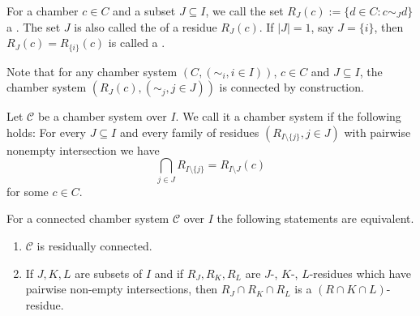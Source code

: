 \begin{defi}
	For a chamber $c \in C$ and a subset $J \subseteq I$, we call the set $R_J(c) := \{ d \in C : c \sim_J d \}$ a . The set $J$ is also called the  of a residue $R_J(c)$. If $|J| = 1$, say $J = \{i\}$, then $R_J(c) = R_{\{i\}}(c)$ is called a .
\end{defi}

Note that for any chamber system $(C,(\sim_i, i \in I))$, $c \in C$ and $J \subseteq I$, the chamber system $(R_J(c), (\sim_j, j \in J))$ is connected by construction.

\begin{defi}
	Let $\mathcal{C}$ be a chamber system over $I$. We call it a  chamber system if the following holds: For every $J \subseteq I$ and every family of residues $(R_{I \setminus \{j\}}, j \in J)$ with pairwise nonempty intersection we have
	$$ \bigcap_{j \in J} R_{I \setminus \{j\}} = R_{I \setminus J}(c) $$
	for some $c \in C$.
\end{defi}

\begin{lemm}
	For a connected chamber system $\mathcal{C}$ over $I$ the following statements are equivalent.
	\begin{enumerate}
		\item $\mathcal{C}$ is residually connected.
		\item If $J,K,L$ are subsets of $I$ and if $R_J, R_K, R_L$ are $J$-, $K$-, $L$-residues which have pairwise non-empty intersections, then $R_J \cap R_K \cap R_L$ is a $(R \cap K \cap L)$-residue.
	\end{enumerate}
\end{lemm}